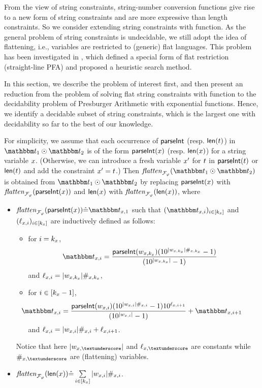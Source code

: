 {From the view of string constraints,
string-number conversion functions give rise to a new form of string constraints
and are more expressive than length constraints.
So we consider extending string constraints with 
{\parseInt} function. 
As the general problem of string constraints is undecidable,
we still adopt the idea of flattening, 
i.e., variables are restricted to (generic) flat languages.
This problem has been investigated in \cite{POPL20},
which defined a special form of flat restriction (straight-line PFA) and 
proposed a heuristic search method.

In this section, 
we describe the problem of interest first, and then 
present an reduction from the problem of solving flat string constraints with {\parseInt} function
to the decidability problem of Presburger Arithmetic with exponential functions.
Hence, we identify a decidable subset of string constraints, which is the largest one with decidability so far to the best of our knowledge.
}

For simplicity, we assume that each occurrence of $\textsf{parseInt}$ (resp. $\textsf{len}(t)$) in $\iterm_1 \op \iterm_2$ is of the form $\textsf{parseInt}(x)$ (resp. $\textsf{len}(x)$) for a string variable $x$. (Otherwise, we can introduce a fresh variable $x'$ for $t$ in $\textsf{parseInt}(t)$ or $\textsf{len}(t)$ and add the constraint $x' = t$.)
Then $\flatten_{\flatfun_\varphi}(\iterm_1 \op \iterm_2)$ is obtained from $\iterm_1 \op \iterm_2$ by replacing $\textsf{parseInt}(x)$ with $\mathit{flatten}_{\mathcal{F}_\varphi}(\textsf{parseInt}(x))$ and $\textsf{len}(x)$ with $\mathit{flatten}_{\mathcal{F}_\varphi}(\textsf{len}(x))$, where 
\begin{itemize}
\item 
$\flatten_{\flatfun_\varphi}(\parseInt(\svarx)) \Def \iterm_{\svarx,1}$  such that $(\iterm_{\svarx, i})_{i \in [k_\svarx]}$ and $(\ell_{x, i})_{i \in [k_x]}$ are inductively defined as follows: 
\begin{itemize}
\item for $i = k_x$, 
$$ \hspace{-4mm} \iterm_{\svarx, i} = \frac{\parseInt(w_{\svarx, k_\svarx}) (10^{|w_{\svarx,k_\svarx}| \#_{\svarx, k_\svarx} } -1 )}{(10^{|w_{\svarx, k_\svarx}|} -1 )}$$ 
and $\ell_{x, i} = |w_{x,k_x}| \#_{x, k_x}$,
%
\item for $i \in [k_x-1]$, 
%
$$ \hspace{-1.2cm} \iterm_{\svarx, i} =  \frac{\parseInt(w_{\svarx, i}) (10^{|w_{\svarx, i} | \#_{\svarx, i} } -1 ) 10^{\ell_{\svarx, i+1}}} {(10^{|w_{\svarx, i}|} -1 )} + \iterm_{\svarx, i+1}$$
%
and $\ell_{x, i} = |w_{x, i} | \#_{x, i} + \ell_{x, i+1}$.
%
\end{itemize}
Notice that here $|w_{\svarx, \textunderscore } |$ and $\ell_{\svarx, \textunderscore}$ are constants while $\#_{\svarx, \textunderscore}$ are (flattening) variables.
%
\item $\mathit{flatten}_{\mathcal{F}_\varphi}(\textsf{len}(x)) \hat{=} \sum \limits_{i \in [k_{x}]} |w_{x, i} | \#_{x, i}$. 
\end{itemize} 



